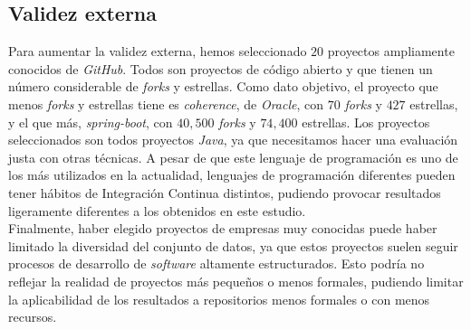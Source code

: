 \subsection{Validez externa}
Para aumentar la validez externa, hemos seleccionado $20$ proyectos ampliamente conocidos de
\textit{GitHub}. Todos son proyectos de código abierto y que tienen un número considerable de
\textit{forks} y estrellas. Como dato objetivo, el proyecto que menos \textit{forks} y estrellas
tiene es \textit{coherence}, de \textit{Oracle}, con $70$ \textit{forks} y $427$ estrellas, y el
que más, \textit{spring-boot}, con $40,500$ \textit{forks} y $74,400$ estrellas. Los proyectos
seleccionados son todos proyectos \textit{Java}, ya que necesitamos hacer una evaluación justa
con otras técnicas. A pesar de que este lenguaje de programación es uno de los más utilizados 
en la actualidad, lenguajes de programación diferentes pueden tener hábitos de Integración
Continua distintos, pudiendo provocar resultados ligeramente diferentes a los obtenidos en este
estudio. \\

Finalmente, haber elegido proyectos de empresas muy conocidas puede haber limitado la
diversidad del conjunto de datos, ya que estos proyectos suelen seguir procesos de desarrollo de
\textit{software} altamente estructurados. Esto podría no reflejar la realidad de proyectos más
pequeños o menos formales, pudiendo limitar la aplicabilidad de los resultados a repositorios
menos formales o con menos recursos.

